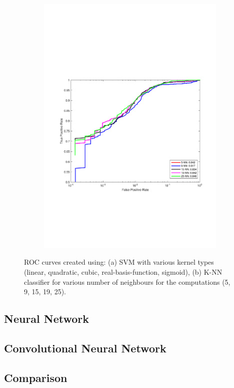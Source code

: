 \begin{figure}[h]
  \begin{subfigure}[b]{0.49\textwidth}
    \includegraphics[width=\textwidth]{figures/K_NN.pdf}
    \caption{}
    \label{fig:K_NN}
  \end{subfigure}
  \caption{ROC curves created using: (a) SVM with various kernel types (linear, quadratic, cubic, real-basis-function, sigmoid), (b) K-NN classifier for various number of neighbours for the computations (5, 9, 15, 19, 25).}
\end{figure}

\subsection{Neural Network}
\subsection{Convolutional Neural Network}
\subsection{Comparison}